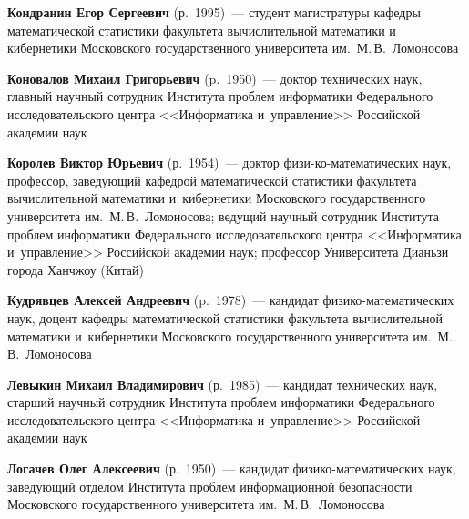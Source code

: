 \begin{multicols}{2}
\vspace*{3pt}

\noindent
\textbf{Кондранин Егор Сергеевич} (р.\ 1995)~--- 
студент ма\-гист\-ра\-ту\-ры  кафедры математической статистики факультета 
вычислительной математики и кибернетики Московского государственного 
университета им.\ М.\,В.~Ломоносова

\vspace*{3pt}

\noindent
\textbf{Коновалов Михаил Григорьевич} (p.\ 1950)~--- 
доктор технических наук, главный научный со\-труд\-ник Института проб\-лем 
информатики Федерального исследовательского центра <<Информатика и~управ\-ле\-ние>> 
Российской академии наук

\vspace*{3pt}


\noindent
\textbf{Королев Виктор Юрьевич} (р.\ 1954)~--- 
доктор физи-\linebreak ко-математи\-че\-ских наук, профессор, за\-ве\-ду\-ющий 
кафедрой математической статистики факультета вычислительной математики 
и~кибернетики Московского государственного университета им.\ М.\,В.~Ломоносова; 
ведущий научный со\-труд\-ник Института проб\-лем информатики 
Федерального исследовательского центра <<Информатика и~управ\-ле\-ние>> 
Российской академии наук; профессор Университета Дианьзи города Ханчжоу (Китай)


\vspace*{3pt}

\noindent
\textbf{Кудрявцев Алексей Андреевич} (p.\ 1978)~--- 
кандидат фи\-зи\-ко-ма\-те\-ма\-ти\-че\-ских наук, доцент кафедры математической 
статистики факультета вычислительной математики и~кибернетики Московского 
государственного университета им.\ М.\,В.~Ломоносова 


\vspace*{3pt}


\noindent
\textbf{Левыкин Михаил Владимирович} (р.\ 1985)~--- 
кандидат технических наук,  старший научный сотрудник Института проб\-лем 
информатики Федерального исследовательского центра 
<<Информатика и~управ\-ле\-ние>> Российской академии наук

\vspace*{3pt}


\noindent
\textbf{Логачев Олег Алексеевич} (р.\ 1950)~--- 
кандидат фи\-зи\-ко-ма\-те\-ма\-ти\-че\-ских наук, за\-ве\-ду\-ющий 
отделом Института проб\-лем информационной без\-опас\-ности Московского
государственного университета им.\ М.\,В.~Ломоносова


\end{multicols}
